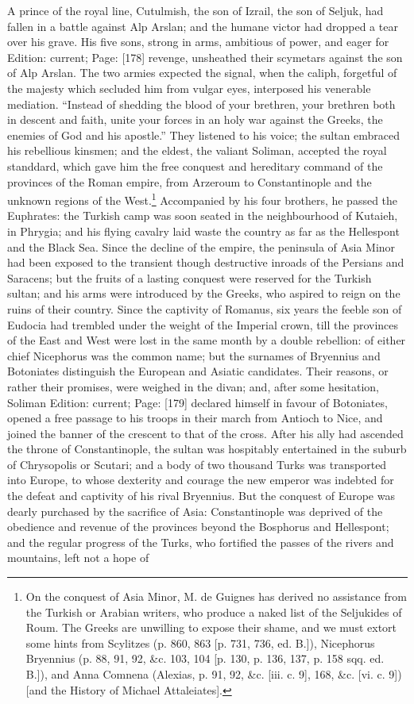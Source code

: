 A prince of the royal line, Cutulmish, the son of Izrail, the son of Seljuk, had fallen in a battle against Alp Arslan; and the humane victor had dropped a tear over his grave. His five sons, strong in arms, ambitious of power, and eager for Edition: current; Page: [178] revenge, unsheathed their scymetars against the son of Alp Arslan. The two armies expected the signal, when the caliph, forgetful of the majesty which secluded him from vulgar eyes, interposed his venerable mediation. \texthebrew{“}Instead of shedding the blood of your brethren, your brethren both in descent and faith, unite your forces in an holy war against the Greeks, the enemies of God and his apostle.\texthebrew{}” They listened to his voice; the sultan embraced his rebellious kinsmen; and the eldest, the valiant Soliman, accepted the royal standdard, which gave him the free conquest and hereditary command of the provinces of the Roman empire, from Arzeroum to Constantinople and the unknown regions of the West.\footnote{On the conquest of Asia Minor, M. de Guignes has derived no assistance from the Turkish or Arabian writers, who produce a naked list of the Seljukides of Roum. The Greeks are unwilling to expose their shame, and we must extort some hints from Scylitzes (p. 860, 863 [p. 731, 736, ed. B.]), Nicephorus Bryennius (p. 88, 91, 92, \&c. 103, 104 [p. 130, p. 136, 137, p. 158 sqq. ed. B.]), and Anna Comnena (Alexias, p. 91, 92, \&c. [iii. c. 9], 168, \&c. [vi. c. 9]) [and the History of Michael Attaleiates].} Accompanied by his four brothers, he passed the Euphrates: the Turkish camp was soon seated in the neighbourhood of Kutaieh, in Phrygia; and his flying cavalry laid waste the country as far as the Hellespont and the Black Sea. Since the decline of the empire, the peninsula of Asia Minor had been exposed to the transient though destructive inroads of the Persians and Saracens; but the fruits of a lasting conquest were reserved for the Turkish sultan; and his arms were introduced by the Greeks, who aspired to reign on the ruins of their country. Since the captivity of Romanus, six years the feeble son of Eudocia had trembled under the weight of the Imperial crown, till the provinces of the East and West were lost in the same month by a double rebellion: of either chief Nicephorus was the common name; but the surnames of Bryennius and Botoniates distinguish the European and Asiatic candidates. Their reasons, or rather their promises, were weighed in the divan; and, after some hesitation, Soliman Edition: current; Page: [179] declared himself in favour of Botoniates, opened a free passage to his troops in their march from Antioch to Nice, and joined the banner of the crescent to that of the cross. After his ally had ascended the throne of Constantinople, the sultan was hospitably entertained in the suburb of Chrysopolis or Scutari; and a body of two thousand Turks was transported into Europe, to whose dexterity and courage the new emperor was indebted for the defeat and captivity of his rival Bryennius. But the conquest of Europe was dearly purchased by the sacrifice of Asia: Constantinople was deprived of the obedience and revenue of the provinces beyond the Bosphorus and Hellespont; and the regular progress of the Turks, who fortified the passes of the rivers and mountains, left not a hope of 